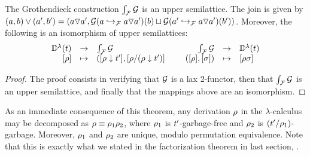 \begin{theorem}[Factorization]
The Grothendieck construction $\grothy{\ulbF}{\ulbG}$ is an upper semilattice.
The join is given by $(a,b) \lor (a',b') = (a \lorF a', \ulbG(\ptF{a \lorF a'}{a})(b) \sqcup \ulbG(\ptF{a \lorF a'}{a'})(b'))$.
Moreover, the following is an isomorphism of upper semilattices:
\[
  \begin{array}{rcl}
    \ulbDerivLam{\tm}       & \to    & \grothy{\ulbF}{\ulbG} \\
    \cls{\redseq}           & \mapsto   & (\cls{\redseq \sieve \tm'}, \cls{\redseq / (\redseq \sieve \tm')} \\
  \end{array}
  \HS
  \begin{array}{rcl}
    \grothy{\ulbF}{\ulbG}             & \to    & \ulbDerivLam{\tm} \\
    (\cls{\redseq}, \cls{\redseqtwo}) & \mapsto & \cls{\redseq\redseqtwo} \\
  \end{array}
\]
\end{theorem}
\begin{proof}
The proof consists in verifying that $\ulbG$ is a lax 2-functor,
then that $\grothy{\ulbF}{\ulbG}$ is an upper semilattice,
and finally that the mappings above are an isomorphism.
\end{proof}
As an immediate consequence of this theorem,
any derivation $\redseq$ in the $\lambda$-calculus
may be decomposed as $\redseq \permeq \redseq_1\redseq_2$,
where $\redseq_1$ is $\tm'$-garbage-free
and $\redseq_2$ is $(\tm'/\redseq_1)$-garbage.
Moreover, $\redseq_1$ and $\redseq_2$ are unique, modulo permutation equivalence.
Note that this is exactly what we stated in the factorization theorem in last section,
.


